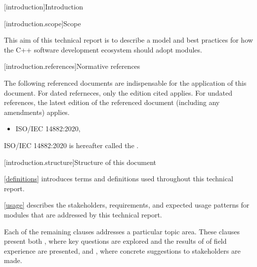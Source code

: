 
[introduction]{Introduction}

[introduction.scope]{Scope}

\pnum
{}%
This aim of this technical report is to describe a model and best practices for
how the C++ software development ecosystem should adopt modules.
%

%
[introduction.references]{Normative references}

\pnum
{}%
The following referenced documents are indispensable for the application of this
document.
For dated referneces, only the edition cited applies.
For undated references, the latest edition of the referenced document (including
any amendments) applies.

\begin{itemize}
\item ISO/IEC 14882:2020, 
\end{itemize}

\pnum
ISO/IEC 14882:2020 is hereafter called the .

[introduction.structure]{Structure of this document}

\pnum
{}%
\ref{definitions} introduces terms and definitions used throughout this
technical report.

\ref{usage} describes the stakeholders, requirements, and expected usage
patterns for modules that are addressed by this technical report.

\pnum
Each of the remaining clauses addresses a particular topic area.
These clauses present both , where key questions are
explored and the results of of field experience are presented, and
, where concrete suggestions to stakeholders are made.

